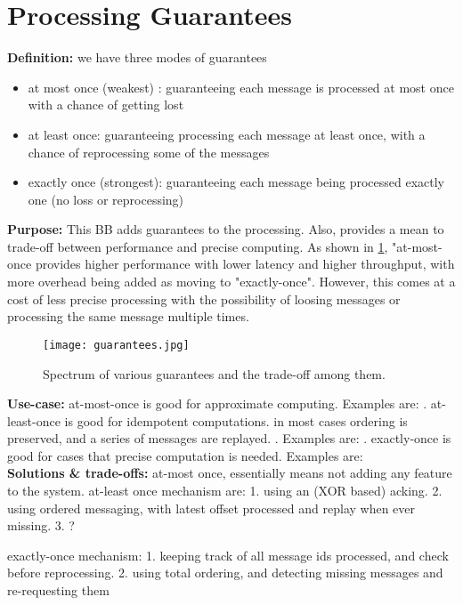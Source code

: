 \section{Processing Guarantees}

	\noindent\textbf{Definition:} we have three modes of guarantees 
	\begin{itemize}
		\item at most once (weakest) : guaranteeing each message is processed at most once with a chance of getting lost
		\item at least once: guaranteeing processing each message at least once, with a chance of reprocessing some of the messages
		\item exactly once (strongest): guaranteeing each message being processed exactly one (no loss or reprocessing)
	\end{itemize}	 

	\noindent \textbf{Purpose:} This BB adds guarantees to the processing. Also, provides a mean to trade-off between performance and precise computing. As shown in \ref{fig:guarantees}, "at-most-once provides higher performance with lower latency and higher throughput, with more overhead being added as moving to "exactly-once". However, this comes at a cost of less precise processing with the possibility of loosing messages or processing the same message multiple times.
	
	\begin{figure}[h]
		\centering
		\texttt{[image: guarantees.jpg]}
		\caption{Spectrum of various guarantees and the trade-off among them.}
		\label{fig:guarantees}
	\end{figure}
	
	
	\noindent \textbf{Use-case:} at-most-once is good for approximate computing. Examples are: . at-least-once is good for idempotent computations. in most cases ordering is preserved, and a series of messages are replayed. . Examples are: .  exactly-once is good for cases that precise computation is needed. Examples are: \\
	

\noindent \textbf{Solutions \& trade-offs:} at-most once, essentially means not adding any feature to the system. at-least once mechanism are: 1. using an (XOR based) acking. 2. using ordered messaging, with latest offset processed and replay when ever missing. 3. ?

exactly-once mechanism: 1. keeping track of all message ids processed, and check before reprocessing. 2. using total ordering, and detecting missing messages and re-requesting them 
 \\

